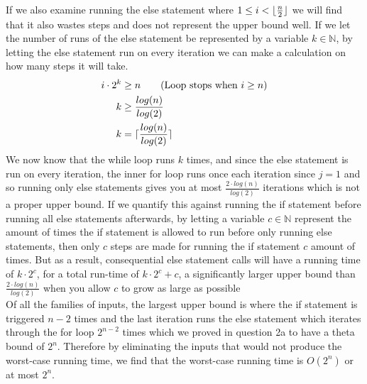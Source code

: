 \documentclass[20pt]{article}
\DeclarePairedDelimiter{\ceil}{\lceil}{\rceil}
\DeclarePairedDelimiter\floor{\lfloor}{\rfloor}
\begin{document}
\begin{enumerate}
    If we also examine running the else statement where $1 \leq i < \floor{\frac{n}{2}}$ we will find that it also wastes steps and does not represent the upper bound well. If we let the number of runs of the else statement be represented by a variable $k\in\mathbb{N}$, by letting the else statement run on every iteration we can make a calculation on how many steps it will take.
    \begin{align}
        i\cdot2^k &\geq n \tag{Loop stops when $i \geq n$}\nonumber\\
        k &\geq \frac{log(n)}{log(2)}\nonumber\\
        k &= \ceil{\frac{log(n)}{log(2)}}\nonumber
    \end{align}
    We now know that the while loop runs $k$ times, and since the else statement is run on every iteration, the inner for loop runs once each iteration since $j = 1$ and so running only else statements gives you at most $\frac{2\cdot log(n)}{log(2)}$ iterations which is not a proper upper bound. If we quantify this against running the if statement before running all else statements afterwards, by letting a variable $c\in\mathbb{N}$ represent the amount of times the if statement is allowed to run before only running else statements, then only $c$ steps are made for running the if statement $c$ amount of times. But as a result, consequential else statement calls will have a running time of $k\cdot2^c$, for a total run-time of $k\cdot2^c + c$, a significantly larger upper bound than $\frac{2\cdot log(n)}{log(2)}$ when you allow $c$ to grow as large as possible\\
    
    Of all the families of inputs, the largest upper bound is where the if statement is triggered $n-2$ times and the last iteration runs the else statement which iterates through the for loop $2^{n-2}$ times which we proved in question 2a to have a theta bound of $2^n$. Therefore by eliminating the inputs that would not produce the worst-case running time, we find that the worst-case running time is $O(2^n)$ or at most $2^n$.
\end{enumerate}

\newpage
\end{document}

